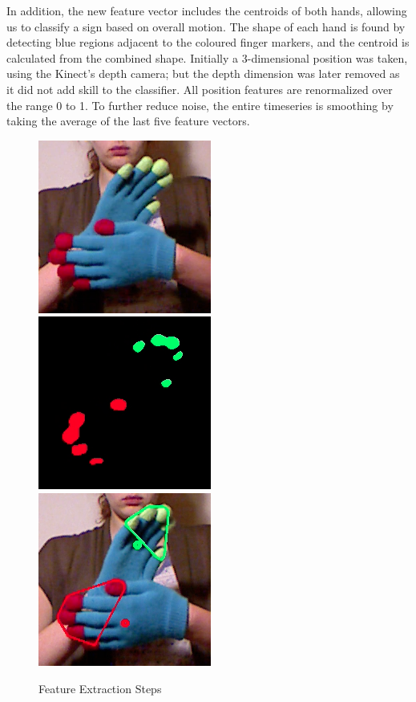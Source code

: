 \documentclass[12pt]{article}
\begin{document}
In addition, the new feature vector includes the centroids of both hands, allowing us to classify a sign based on overall motion. The shape of each hand is found by detecting blue regions adjacent to the coloured finger markers, and the centroid is calculated from the combined shape. Initially a 3-dimensional position was taken, using the Kinect’s depth camera; but the depth dimension was later removed as it did not add skill to the classifier. All position features are renormalized over the range 0 to 1. To further reduce noise, the entire timeseries is smoothing by taking the average of the last five feature vectors.

\begin{figure}[h!]
  \centering
  \includegraphics[scale=.7]{fe1.png}
  \includegraphics[scale=.7]{fe2.png}
  \includegraphics[scale=.7]{fe3.png}
  \caption{Feature Extraction Steps}
  \label{fe_steps}
\end{figure}
\end{document}
